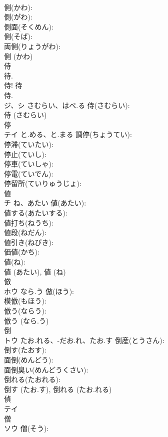 \documentclass[8pt]{extreport}
\begin{document}
\begin{CJK}{UTF8}{min}
\\	側(かわ): 
\\	側(がわ): 
\\	側面(そくめん): 
\\	側(そば): 
\\	両側(りょうがわ): 
\\	側 (かわ)
\\	侍			
\\	待. 
\\	侍! 待 
\\	侍.	
\\	ジ、シ	さむらい、はべ.る	侍(さむらい): 
\\	侍 (さむらい)
\\	停			
\\	テイ	と.める、と.まる	調停(ちょうてい): 
\\	停滞(ていたい): 
\\	停止(ていし): 
\\	停車(ていしゃ): 
\\	停電(ていでん): 
\\	停留所(ていりゅうじょ): 
\\	値			
\\	チ	ね、あたい	値(あたい): 
\\	値する(あたいする): 
\\	値打ち(ねうち): 
\\	値段(ねだん): 
\\	値引き(ねびき): 
\\	価値(かち): 
\\	値(ね): 
\\	値 (あたい), 値 (ね)
\\	倣			
\\	ホウ	なら.う	倣(ほう): 
\\	模倣(もほう): 
\\	倣う(ならう): 
\\	倣う (なら.う)
\\	倒			
\\	トウ	たお.れる、-だお.れ、たお.す	倒産(とうさん): 
\\	倒す(たおす): 
\\	面倒(めんどう): 
\\	面倒臭い(めんどうくさい): 
\\	倒れる(たおれる): 
\\	倒す (たお.す), 倒れる (たお.れる)
\\	偵			
\\	テイ			
\\	僧			
\\	ソウ		僧(そう): 

\end{CJK}
\end{document}

